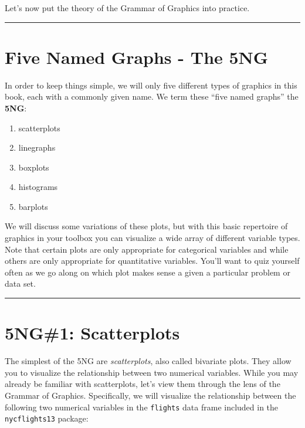 \documentclass[12pt, krantz2,]{krantz}
\providecommand{\tightlist}{%
  \setlength{\itemsep}{0pt}\setlength{\parskip}{0pt}}
\begin{document}
Let's now put the theory of the Grammar of Graphics into practice.

\begin{center}\rule{0.5\linewidth}{\linethickness}\end{center}

\hypertarget{FiveNG}{%
\section{Five Named Graphs - The 5NG}\label{FiveNG}}

In order to keep things simple, we will only five different types of graphics in this book, each with a commonly given name. We term these ``five named graphs'' the \textbf{5NG}:

\begin{enumerate}
\def\labelenumi{\arabic{enumi}.}
\tightlist
\item
  scatterplots
\item
  linegraphs
\item
  boxplots
\item
  histograms
\item
  barplots
\end{enumerate}

We will discuss some variations of these plots, but with this basic repertoire of graphics in your toolbox you can visualize a wide array of different variable types. Note that certain plots are only appropriate for categorical variables and while others are only appropriate for quantitative variables. You'll want to quiz yourself often as we go along on which plot makes sense a given a particular problem or data set.

\begin{center}\rule{0.5\linewidth}{\linethickness}\end{center}

\hypertarget{scatterplots}{%
\section{5NG\#1: Scatterplots}\label{scatterplots}}

The simplest of the 5NG are \emph{scatterplots}, also called bivariate plots. They allow you to visualize the relationship between two numerical variables. While you may already be familiar with scatterplots, let's view them through the lens of the Grammar of Graphics. Specifically, we will visualize the relationship between the following two numerical variables in the \texttt{flights} data frame included in the \texttt{nycflights13} package:
\end{document}
